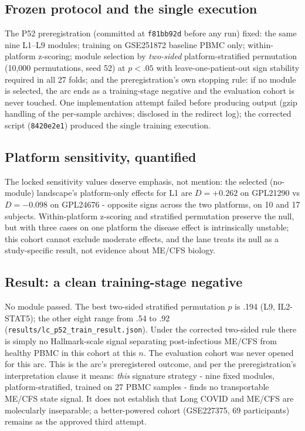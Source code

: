 \documentclass[11pt,a4paper]{article}
\begin{document}
\subsection{Frozen protocol and the single execution}
The P52 preregistration (committed at \texttt{f81bb92d} before any run) fixed:
the same nine L1--L9 modules; training on GSE251872 baseline PBMC only;
within-platform z-scoring; module selection by \emph{two-sided}
platform-stratified permutation (10{,}000 permutations, seed 52) at $p<.05$
with leave-one-patient-out sign stability required in all 27 folds; and the
preregistration's own stopping rule: if no module is selected, the arc ends as
a training-stage negative and the evaluation cohort is never touched. One
implementation attempt failed before producing output (gzip handling of the
per-sample archives; disclosed in the redirect log); the corrected script
(\texttt{8420e2e1}) produced the single training execution.

\subsection{Platform sensitivity, quantified}
The locked sensitivity values deserve emphasis, not mention: the selected
(no-module) landscape's platform-only effects for L1 are $D=+0.262$ on
GPL21290 vs $D=-0.098$ on GPL24676 - opposite signs across the two
platforms, on 10 and 17 subjects. Within-platform z-scoring and stratified
permutation preserve the null, but with three cases on one platform the
disease effect is intrinsically unstable; this cohort cannot exclude
moderate effects, and the lane treats its null as a study-specific result,
not evidence about ME/CFS biology.

\subsection{Result: a clean training-stage negative}
No module passed. The best two-sided stratified permutation $p$ is .194
(L9, IL2-STAT5); the other eight range from .54 to .92
(\texttt{results/lc\_p52\_train\_result.json}). Under the corrected two-sided
rule there is simply no Hallmark-scale signal separating post-infectious
ME/CFS from healthy PBMC in this cohort at this $n$. The evaluation cohort was
never opened for this arc. This is the arc's preregistered outcome, and per the
preregistration's interpretation clause it means: \emph{this} signature
strategy - nine fixed modules, platform-stratified, trained on 27 PBMC
samples - finds no transportable ME/CFS state signal. It does not establish
that Long COVID and ME/CFS are molecularly inseparable; a better-powered
cohort (GSE227375, 69 participants) remains as the approved third attempt.
\end{document}
